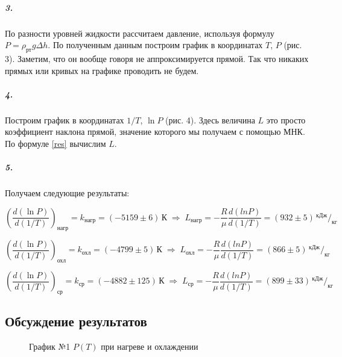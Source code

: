 \documentclass[a4paper, 12pt]{article}
\begin{document}
\subparagraph*{3.}  По разности уровней жидкости рассчитаем давление, используя формулу $P = \rho_{рт} g \Delta h$. По полученным данным построим график в координатах $T$,  $P$ (рис. 3). Заметим, что он вообще говоря не аппроксимируется прямой. Так что никаких прямых или кривых на графике проводить не будем. 

\subparagraph*{4.} Построим график в координатах $1/T$,  $\ln P$ (рис. 4). Здесь величина $L$ это просто коэффициент наклона прямой, значение которого мы получаем с помощью МНК. По формуле \eqref{res} вычислим $L$.

\subparagraph*{5.} Получаем следующие результаты:

\[\left(\dfrac{d(\ln P)}{d(1/T)}\right)_{\text{нагр}} = k_{\text{нагр}} = (-5159 \pm 6)\, \text{К}  \; \Rightarrow \; L_{\text{нагр}} = -\dfrac{R}{\mu} \dfrac{d(ln P)}{d(1/T)} = (932 \pm 5)\, ^{\text{кДж}}/_{\text{кг}}\]
	
\[\left(\dfrac{d(\ln P)}{d(1/T)}\right)_{\text{охл}} = k_{\text{охл}} = (-4799 \pm  5)\, \text{К} \; \Rightarrow \; L_{\text{охл}} = -\dfrac{R}{\mu} \dfrac{d(ln P)}{d(1/T)} = (866 \pm 5)\, ^{\text{кДж}}/_{\text{кг}}\]
	
\[\left(\dfrac{d(\ln P)}{d(1/T)}\right)_{\text{ср}} =k_{\text{ср}} = (-4882 \pm  125)\, \text{К} \; \Rightarrow \; L_{\text{ср}} = -\dfrac{R}{\mu} \dfrac{d(ln P)}{d(1/T)} = (899 \pm 33)\, ^{\text{кДж}}/_{\text{кг}}\]

\subsection*{Обсуждение результатов}

\newpage

\begin{figure}[h]
	\caption[]{\label{fig:2} График №1 $P(T)$ при нагреве и охлаждении}
\end{figure}
\end{document}
